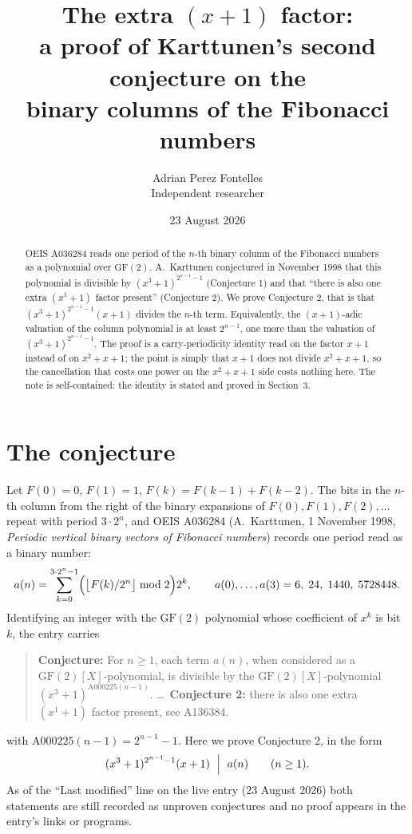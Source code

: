\documentclass[11pt,a4paper]{article}
\title{The extra $(x+1)$ factor:\\
a proof of Karttunen's second conjecture on the\\
binary columns of the Fibonacci numbers}
\author{Adrian Perez Fontelles\\ \small Independent researcher}
\date{23 August 2026}
\theoremstyle{plain}
\theoremstyle{definition}
\begin{document}
\maketitle

\begin{abstract}
OEIS A036284 reads one period of the $n$-th binary column of the Fibonacci numbers as a
polynomial over $\mathrm{GF}(2)$. A.~Karttunen conjectured in November 1998 that this
polynomial is divisible by $(x^{3}+1)^{2^{n-1}-1}$ (Conjecture 1) and that ``there is also
one extra $(x^{1}+1)$ factor present'' (Conjecture 2). We prove Conjecture 2, that is that
$(x^{3}+1)^{2^{n-1}-1}(x+1)$ divides the $n$-th term. Equivalently, the $(x+1)$-adic
valuation of the column polynomial is at least $2^{n-1}$, one more than the valuation of
$(x^{3}+1)^{2^{n-1}-1}$. The proof is a carry-periodicity identity read on the factor $x+1$
instead of on $x^{2}+x+1$; the point is simply that $x+1$ does not divide $x^{2}+x+1$, so
the cancellation that costs one power on the $x^{2}+x+1$ side costs nothing here. The note
is self-contained: the identity is stated and proved in Section~3.
\end{abstract}

\section{The conjecture}

Let $F(0)=0$, $F(1)=1$, $F(k)=F(k-1)+F(k-2)$. The bits in the $n$-th column from the right
of the binary expansions of $F(0),F(1),F(2),\dots$ repeat with period $3\cdot2^{n}$, and
OEIS A036284 (A.~Karttunen, 1 November 1998, \emph{Periodic vertical binary vectors of
Fibonacci numbers}) records one period read as a binary number:
\[
  a(n)=\sum_{k=0}^{3\cdot2^{n}-1}\Bigl(\bigl\lfloor F(k)/2^{n}\bigr\rfloor\bmod2\Bigr)2^{k},
  \qquad a(0),\dots,a(3)=6,\;24,\;1440,\;5728448.
\]
Identifying an integer with the $\mathrm{GF}(2)$ polynomial whose coefficient of $x^{k}$ is
bit $k$, the entry carries

\begin{quote}
\textbf{Conjecture:} For $n\ge1$, each term $a(n)$, when considered as a
$\mathrm{GF}(2)[X]$-polynomial, is divisible by the $\mathrm{GF}(2)[X]$-polynomial
$(x^{3}+1)^{\mathrm{A000225}(n-1)}$. \dots\ \textbf{Conjecture 2:} there is also one extra
$(x^{1}+1)$ factor present, see A136384.
\end{quote}

with $\mathrm{A000225}(n-1)=2^{n-1}-1$. Here we prove Conjecture 2, in the form
\[
  (x^{3}+1)^{2^{n-1}-1}(x+1)\ \Bigm|\ a(n)\qquad(n\ge1).
\]
As of the ``Last modified'' line on the live entry (23 August 2026) both statements are
still recorded as unproven conjectures and no proof appears in the entry's links or
programs.
\end{document}
